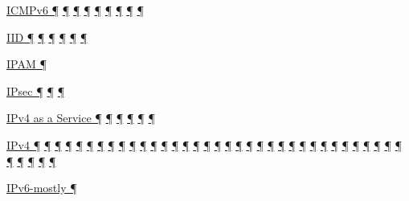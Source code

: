 \documentclass[
]{article}
\begin{document}
\hyperref[address-resolution]{ICMPv6 ¶} \hyperref[auto-configuration]{¶}
\hyperref[extension-headers-and-options]{¶}
\hyperref[dual-stack-scenarios]{¶}
\hyperref[translation-and-ipv4-as-a-service]{¶} \hyperref[security]{¶}
\hyperref[filtering]{¶} \hyperref[troubleshooting]{¶}
\hyperref[advanced-troubleshooting]{¶}

\hyperref[addresses]{IID ¶}
\hyperref[ipv6-primary-differences-from-ipv4]{¶}
\hyperref[translation-and-ipv4-as-a-service]{¶}
\hyperref[layer-2-considerations]{¶}
\hyperref[multi-prefix-operation]{¶} \hyperref[multihoming]{¶}

\hyperref[address-and-prefix-management]{IPAM ¶}

\hyperref[extension-headers-and-options]{IPsec ¶}
\hyperref[packet-format]{¶} \hyperref[security]{¶}

\hyperref[coexistence-with-legacy-ipv4]{IPv4 as a Service ¶}
\hyperref[dual-stack-scenarios]{¶}
\hyperref[translation-and-ipv4-as-a-service]{¶}
\hyperref[network-design]{¶} \hyperref[multihoming]{¶}
\hyperref[deployment-in-the-home]{¶}

\hyperref[how-a-network-operations-center-sees-ipv6]{IPv4 ¶}
\hyperref[how-an-application-programmer-sees-ipv6]{¶}
\hyperref[why-version-6]{¶} \hyperref[address-resolution]{¶}
\hyperref[addresses]{¶} \hyperref[dns]{¶}
\hyperref[extension-headers-and-options]{¶}
\hyperref[layer-2-functions]{¶} \hyperref[managed-configuration]{¶}
\hyperref[routing]{¶}
\hyperref[source-and-destination-address-selection]{¶}
\hyperref[traffic-class-and-flow-label]{¶}
\hyperref[transport-protocols]{¶}
\hyperref[coexistence-with-legacy-ipv4]{¶}
\hyperref[dual-stack-scenarios]{¶}
\hyperref[ipv6-primary-differences-from-ipv4]{¶}
\hyperref[obsolete-techniques]{¶}
\hyperref[translation-and-ipv4-as-a-service]{¶} \hyperref[tunnels]{¶}
\hyperref[security]{¶} \hyperref[filtering]{¶}
\hyperref[layer-2-considerations]{¶} \hyperref[topology-obfuscation]{¶}
\hyperref[network-design]{¶} \hyperref[address-planning]{¶}
\hyperref[address-and-prefix-management]{¶}
\hyperref[benchmarking-and-monitoring]{¶}
\hyperref[energy-consumption]{¶} \hyperref[multi-prefix-operation]{¶}
\hyperref[multihoming]{¶} \hyperref[packet-size-and-jumbo-frames]{¶}
\hyperref[cern-and-the-lhc]{¶} \hyperref[deployment-by-carriers]{¶}
\hyperref[deployment-in-the-home]{¶} \hyperref[status]{¶}
\hyperref[troubleshooting]{¶} \hyperref[advanced-troubleshooting]{¶}
\hyperref[tools]{¶} \hyperref[obsolete-features-in-ipv6]{¶}
\hyperref[further-reading]{¶}

\hyperref[dual-stack-scenarios]{IPv6-mostly ¶}
\end{document}

